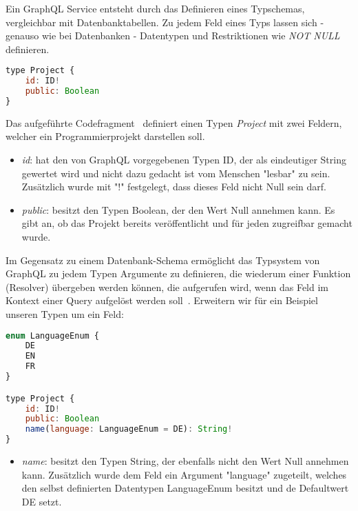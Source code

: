Ein GraphQL Service entsteht durch das Definieren eines Typschemas, vergleichbar mit Datenbanktabellen. Zu jedem Feld eines Typs lassen sich - genauso wie bei Datenbanken -
Datentypen und Restriktionen wie \emph{NOT NULL} definieren.

\begin{lstlisting}[language=Javascript,float=h!,caption={Project Typdefinition}, label={fig:basics:graphql:1}]
type Project {
    id: ID!
    public: Boolean
}
\end{lstlisting}

Das aufgeführte Codefragment~ definiert einen Typen \emph{Project} mit zwei Feldern, welcher ein Programmierprojekt darstellen soll.

\begin{itemize}
	\setlength\itemsep{-1em}
    \item \emph{id}: hat den von GraphQL vorgegebenen Typen ID, der als eindeutiger String gewertet wird und nicht dazu gedacht ist vom Menschen "lesbar" zu sein.
    Zusätzlich wurde mit "!" festgelegt, dass dieses Feld nicht Null sein darf.
    \item \emph{public}: besitzt den Typen Boolean, der den Wert Null annehmen kann.
    Es gibt an, ob das Projekt bereits veröffentlicht und für jeden zugreifbar gemacht wurde.
\end{itemize}

Im Gegensatz zu einem Datenbank-Schema ermöglicht das Typsystem von GraphQL zu jedem Typen Argumente zu definieren,
die wiederum einer Funktion (Resolver) übergeben werden können,
die aufgerufen wird, wenn das Feld im Kontext einer Query aufgelöst werden soll~\cite{graphql-resolver}.
Erweitern wir für ein Beispiel unseren Typen um ein Feld:

\begin{lstlisting}[language=Javascript,float=h!,caption={Erweiterung der Typdefinition von Project und Einführung eines Enums mit Ländercodes}, label={fig:basics:graphql:2}]
enum LanguageEnum {
    DE
    EN
    FR
}

type Project {
    id: ID!
    public: Boolean
    name(language: LanguageEnum = DE): String!
}
\end{lstlisting}

\begin{itemize}
	\setlength\itemsep{-1em}
    \item \emph{name}: besitzt den Typen String, der ebenfalls nicht den Wert Null annehmen kann. Zusätzlich wurde dem Feld ein Argument "language" zugeteilt,
    welches den selbst definierten Datentypen LanguageEnum besitzt und de Defaultwert DE setzt.
\end{itemize}

